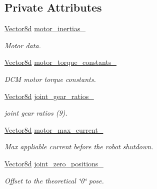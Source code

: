 \subsection*{Private Attributes}
\begin{DoxyCompactItemize}
\item 
\hyperlink{common__header_8hpp_a98975ffbe0bca1296078e0350dfedd60}{Vector8d} \hyperlink{classblmc__robots_1_1Solo8TI_a59f11040a17d232823756c26c6b68145}{motor\+\_\+inertias\+\_\+}
\begin{DoxyCompactList}\small\item\em Motor data. \end{DoxyCompactList}\item 
\hyperlink{common__header_8hpp_a98975ffbe0bca1296078e0350dfedd60}{Vector8d} \hyperlink{classblmc__robots_1_1Solo8TI_ac2b9093468149839f7d6a6be43d108e7}{motor\+\_\+torque\+\_\+constants\+\_\+}
\begin{DoxyCompactList}\small\item\em D\+CM motor torque constants. \end{DoxyCompactList}\item 
\hyperlink{common__header_8hpp_a98975ffbe0bca1296078e0350dfedd60}{Vector8d} \hyperlink{classblmc__robots_1_1Solo8TI_a670ec9c986127612259d66e4f33d20b3}{joint\+\_\+gear\+\_\+ratios\+\_\+}
\begin{DoxyCompactList}\small\item\em joint gear ratios (9). \end{DoxyCompactList}\item 
\hyperlink{common__header_8hpp_a98975ffbe0bca1296078e0350dfedd60}{Vector8d} \hyperlink{classblmc__robots_1_1Solo8TI_afc3ba4524871faadbc1150f40e013f95}{motor\+\_\+max\+\_\+current\+\_\+}
\begin{DoxyCompactList}\small\item\em Max appliable current before the robot shutdown. \end{DoxyCompactList}\item 
\hyperlink{common__header_8hpp_a98975ffbe0bca1296078e0350dfedd60}{Vector8d} \hyperlink{classblmc__robots_1_1Solo8TI_a9dfb11213122b0a882dd54720ec719c3}{joint\+\_\+zero\+\_\+positions\+\_\+}
\begin{DoxyCompactList}\small\item\em Offset to the theoretical \char`\"{}0\char`\"{} pose. \end{DoxyCompactList}\item 
\mbox{\label{classblmc__robots_1_1Solo8TI_a9eca8246a28a6f2f2d1deff52228e69f}} 

\end{DoxyCompactItemize}

